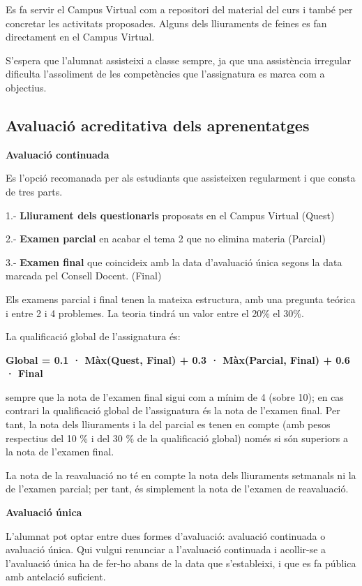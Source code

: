 \documentclass[
  catalan,
]{article}
\theoremstyle{definition}
\theoremstyle{definition}
\theoremstyle{definition}
\theoremstyle{definition}
\theoremstyle{remark}
\begin{document}
Es fa servir el Campus Virtual com a repositori del material del curs i també per concretar les activitats proposades. Alguns dels lliuraments de feines es fan directament en el Campus Virtual.

S'espera que l'alumnat assisteixi a classe sempre, ja que una assistència irregular dificulta l'assoliment de les competències que l'assignatura es marca com a objectius.

\subsection*{Avaluació acreditativa dels aprenentatges}\label{avaluaciuxf3-acreditativa-dels-aprenentatges}

\textbf{Avaluació continuada}

Es l'opció recomanada per als estudiants que assisteixen regularment i que consta de tres parts.

1.- \textbf{Lliurament dels questionaris} proposats en el Campus Virtual (Quest)

2.- \textbf{Examen parcial} en acabar el tema 2 que no elimina materia (Parcial)

3.- \textbf{Examen final} que coincideix amb la data d'avaluació única segons la data marcada pel Consell Docent. (Final)

Els examens parcial i final tenen la mateixa estructura, amb una pregunta teórica i entre 2 i 4 problemes. La teoria tindrá un valor entre el 20\% el 30\%.

La qualificació global de l'assignatura és:

\textbf{Global = 0.1 · Màx(Quest, Final) + 0.3 · Màx(Parcial, Final) + 0.6 · Final}

sempre que la nota de l'examen final sigui com a mínim de 4 (sobre 10); en cas contrari la qualificació global de l'assignatura és la nota de l'examen final. Per tant, la nota dels lliuraments i la del parcial es tenen en compte (amb pesos respectius del 10 \% i del 30 \% de la qualificació global) només si són superiors a la nota de l'examen final.

La nota de la reavaluació no té en compte la nota dels lliuraments setmanals ni la de l'examen parcial; per tant, és simplement la nota de l'examen de reavaluació.

\textbf{Avaluació única}

L'alumnat pot optar entre dues formes d'avaluació: avaluació continuada o avaluació única. Qui vulgui renunciar a l'avaluació continuada i acollir-se a l'avaluació única ha de fer-ho abans de la data que s'estableixi, i que es fa pública amb antelació suficient.
\end{document}
